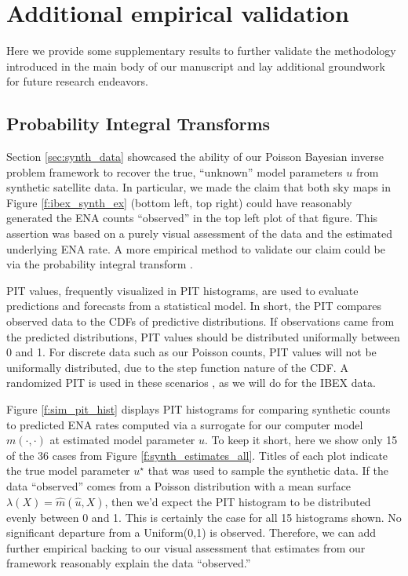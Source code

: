 \documentclass[11pt]{article}
\begin{document}



\appendix

\section{Additional empirical validation}

Here we provide some supplementary results to further validate the methodology
introduced in the main body of our manuscript and lay additional groundwork
for future research endeavors.

\subsection{Probability Integral Transforms}
\label{app:pits}

Section \ref{sec:synth_data} showcased the ability of our Poisson Bayesian
inverse problem framework to recover the {\color{red}true, ``unknown''} model parameters $u$ from
synthetic satellite data. In particular, we made the claim that both sky maps
in Figure \ref{f:ibex_synth_ex} (bottom left, top right) could have reasonably
generated the ENA counts ``observed'' in the top left plot of that figure. This
assertion was based on a purely visual assessment of the data and the estimated
underlying ENA rate. A more empirical method to validate our claim could be via
the probability integral transform
\citep[PIT;][]{gneiting2007probabilistic,diebold1997evaluating,dawid1984present}.

PIT values, frequently visualized in PIT histograms, are used to evaluate
predictions and forecasts from a statistical model. In short, the PIT compares
observed data to the CDFs of predictive distributions. If observations came
from the predicted distributions, PIT values should be distributed uniformally
between 0 and 1. For discrete data such as our Poisson counts, PIT values will
not be uniformally distributed, due to the step function nature of the CDF. A
randomized PIT is used in these scenarios
\citep{gneiting2014probabilistic,czado2009predictive}, as we will do for the
IBEX data.

Figure \ref{f:sim_pit_hist} displays PIT histograms for comparing synthetic
counts to predicted ENA rates computed via a surrogate for our computer model
$m(\cdot,\cdot)$ at estimated model parameter $\hat{u}$. To keep it short, here
we show only 15 of the 36 cases from Figure \ref{f:synth_estimates_all}. Titles
of each plot indicate the true model parameter $u^\star$ that was used to
sample the synthetic data. If the data ``observed'' comes from a Poisson
distribution with a mean surface $\lambda(X) = \hat{m}(\hat{u}, X)$, then we'd
expect the PIT histogram to be distributed evenly between 0 and 1. This is
certainly the case for all 15 histograms shown.  No significant departure from
a Uniform(0,1) is observed. Therefore, we can add further empirical backing to
our visual assessment that estimates from our framework reasonably explain the
data ``observed.''
\end{document}
